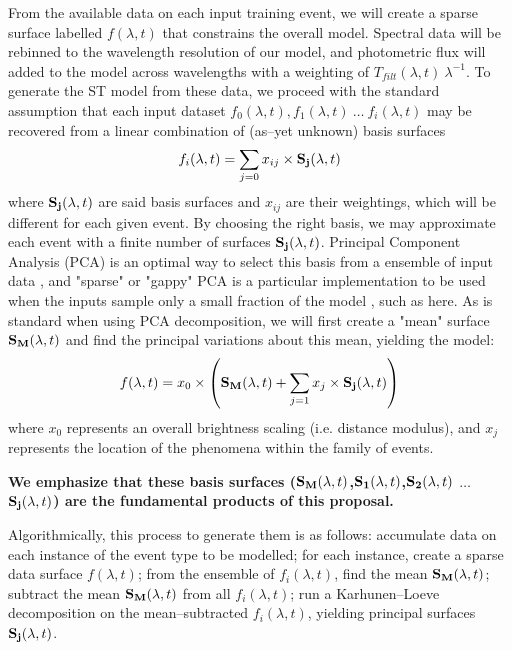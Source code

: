 From the available data on each input training event, we will create a sparse
surface labelled $f(\lambda, t)$ that constrains the overall model.  Spectral
data will be rebinned to the wavelength resolution of our model, and photometric
flux will added to the model across wavelengths with a weighting of
$T_{filt}(\lambda, t)~\lambda^{-1}$.  To generate the ST model from these data,
we proceed with the standard assumption that each input dataset $f_0(\lambda,
t), f_1(\lambda, t)~\ldots~f_i(\lambda, t)$ may be recovered from a linear
combination of (as--yet unknown) basis surfaces $$f_i(\lambda, t) = \sum_{j=0}
x_{ij} \times {\bf S_j}(\lambda, t)$$ where ${\bf S_j}(\lambda, t)$ are said
basis surfaces and $x_{ij}$ are their weightings, which will be different for
each given event.  By choosing the right basis, we may approximate each event
with a finite number of surfaces ${\bf S_j}(\lambda, t)$. Principal Component
Analysis (PCA) is an optimal way to select this basis from a ensemble of input
data \cite[e.g.][for astrophysical application to galaxy
spectra]{1995AJ....110.1071C}, and "sparse" or "gappy" PCA is a particular
implementation to be used when the inputs sample only a small fraction of the
model \citep[e.g.][]{zouht04}, such as here.  As is standard when using PCA
decomposition, we will first create a "mean" surface ${\bf S_M}(\lambda, t)$ and
find the principal variations about this mean, yielding the model: $$f(\lambda,
t) = x_0 \times \left( {\bf S_M}(\lambda, t) + \sum_{j=1} x_j \times {\bf
S_j}(\lambda, t) \right)$$ where $x_0$ represents an overall brightness scaling
(i.e. distance modulus), and $x_j$ represents the location of the phenomena
within the family of events.

\begin{center} {\bf We emphasize that these basis surfaces (${\bf S_M}(\lambda,
t)$,${\bf S_1}(\lambda, t)$,${\bf S_2}(\lambda, t)$ $\ldots$ ${\bf S_j}(\lambda,
t)$) are the fundamental products of this proposal.} \end{center}

Algorithmically, this process to generate them is as follows: accumulate data on
each instance of the event type to be modelled; for each instance, create a
sparse data surface $f(\lambda, t)$; from the ensemble of $f_i(\lambda, t)$,
find the mean ${\bf S_M}(\lambda, t)$; subtract the mean ${\bf S_M}(\lambda, t)$
from all $f_i(\lambda, t)$; run a Karhunen--Loeve decomposition
\citep{Karhunen:47,Loeve:48} on the mean--subtracted $f_i(\lambda, t)$, yielding
principal surfaces ${\bf S_j}(\lambda, t)$.

